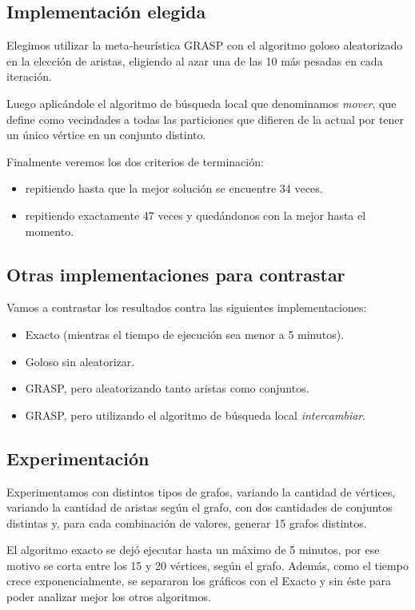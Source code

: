 \subsection{Implementación elegida}

Elegimos utilizar la meta-heurística GRASP con el algoritmo goloso aleatorizado
en la elección de aristas, eligiendo al azar una de las 10 más pesadas en cada
iteración.

Luego aplicándole el algoritmo de búsqueda local que denominamos \textit{mover}, que
define como vecindades a todas las particiones que difieren de la actual por
tener un único vértice en un conjunto distinto.

Finalmente veremos los dos criterios de terminación:
\begin{itemize}
  \item repitiendo hasta que la mejor solución se encuentre 34 veces.
  \item repitiendo exactamente 47 veces y quedándonos con la mejor hasta el momento.
\end{itemize}

\subsection{Otras implementaciones para contrastar}

Vamos a contrastar los resultados contra las siguientes implementaciones:

\begin{itemize}
  \item Exacto (mientras el tiempo de ejecución sea menor a 5 minutos).
  \item Goloso sin aleatorizar.
  \item GRASP, pero aleatorizando tanto aristas como conjuntos.
  \item GRASP, pero utilizando el algoritmo de búsqueda local
  \textit{intercambiar}.
\end{itemize}

\subsection{Experimentación}

Experimentamos con distintos tipos de grafos, variando la cantidad de vértices,
variando la cantidad de aristas según el grafo, con dos cantidades de conjuntos
distintas y, para cada combinación de valores, generar 15 grafos distintos.

El algoritmo exacto se dejó ejecutar hasta un máximo de 5 minutos, por
ese motivo se corta entre los 15 y 20 vértices, según el grafo. Además, como el tiempo crece exponencialmente, se separaron los gráficos con el Exacto y sin éste para poder analizar mejor los otros algoritmos.

